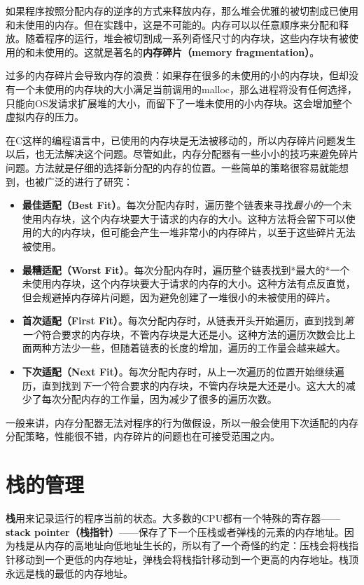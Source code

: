 \documentclass[cn,11pt,chinese]{elegantbook}
\begin{document}
如果程序按照分配内存的逆序的方式来释放内存，那么堆会优雅的被切割成已使用和未使用的内存。但在实践中，这是不可能的。内存可以以任意顺序来分配和释放。随着程序的运行，堆会被切割成一系列奇怪尺寸的内存块，这些内存块有被使用的和未使用的。这就是著名的\textbf{内存碎片（memory fragmentation）}。

过多的内存碎片会导致内存的浪费：如果存在很多的未使用的小的内存块，但却没有一个未使用的内存块的大小满足当前调用的malloc，那么进程将没有任何选择，只能向OS发请求扩展堆的大小，而留下了一堆未使用的小内存块。这会增加整个虚拟内存的压力。

在C这样的编程语言中，已使用的内存块是无法被移动的，所以内存碎片问题发生以后，也无法解决这个问题。尽管如此，内存分配器有一些小小的技巧来避免碎片问题。方法就是仔细的选择新分配的内存的位置。一些简单的策略很容易就能想到，也被广泛的进行了研究：

\begin{itemize}
  \item \textbf{最佳适配（Best Fit）}。每次分配内存时，遍历整个链表来寻找\textit{最小的}一个未使用内存块，这个内存块要大于请求的内存的大小。这种方法将会留下可以使用的大的内存块，但可能会产生一堆非常小的内存碎片，以至于这些碎片无法被使用。
  \item \textbf{最糟适配（Worst Fit）}。每次分配内存时，遍历整个链表找到*最大的*一个未使用内存块，这个内存块要大于请求的内存的大小。这种方法有点反直觉，但会规避掉内存碎片问题，因为避免创建了一堆很小的未被使用的碎片。
  \item \textbf{首次适配（First Fit）}。每次分配内存时，从链表开头开始遍历，直到找到\textit{第一个}符合要求的内存块，不管内存块是大还是小。这种方法的遍历次数会比上面两种方法少一些，但随着链表的长度的增加，遍历的工作量会越来越大。
  \item \textbf{下次适配（Next Fit）}。每次分配内存时，从上一次遍历的位置开始继续遍历，直到找到\textit{下一个}符合要求的内存块，不管内存块是大还是小。这大大的减少了每次分配内存的工作量，因为减少了很多的遍历次数。
\end{itemize}

一般来讲，内存分配器无法对程序的行为做假设，所以一般会使用下次适配的内存分配策略，性能很不错，内存碎片的问题也在可接受范围之内。

\section{栈的管理}

\textbf{栈}用来记录运行的程序当前的状态。大多数的CPU都有一个特殊的寄存器——\textbf{stack pointer（栈指针）}——保存了下一个压栈或者弹栈的元素的内存地址。因为栈是从内存的高地址向低地址生长的，所以有了一个奇怪的约定：压栈会将栈指针移动到一个更低的内存地址，弹栈会将栈指针移动到一个更高的内存地址。栈顶永远是栈的最低的内存地址。
\end{document}
